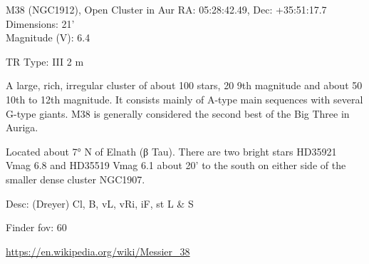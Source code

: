 \begin{block}{M38 (NGC1912), Open Cluster in Aur}
    RA: 05:28:42.49, Dec: +35:51:17.7 \\ 
    Dimensions: 21' \\ 
    Magnitude (V): 6.4

    TR Type: III 2 m

    A large, rich, irregular cluster of about 100 stars, 20 9th magnitude and
    about 50 10th to 12th magnitude. It consists mainly of A-type main
    sequences with several G-type giants. M38 is generally considered the
    second best of the Big Three in Auriga.
    
    Located about 7° N of Elnath (β Tau). There are two bright stars HD35921
    Vmag 6.8 and HD35519 Vmag 6.1 about 20' to the south on either side of the
    smaller dense cluster NGC1907.

    Desc: (Dreyer) Cl, B, vL, vRi, iF, st L \& S 

    Finder fov: 60 

    \url{https://en.wikipedia.org/wiki/Messier_38} 
\end{block}
